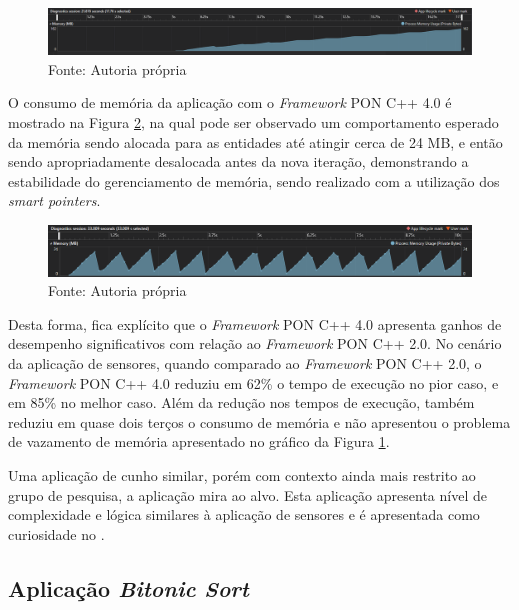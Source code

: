 \begin{figure}[!htb]
\centering
\includegraphics[width=\textwidth]{../figures/fw2_mem.png}
\smallskip
\caption{Consumo de memória \textit{Framework} PON C++ 2.0}
\caption*{Fonte: Autoria própria}
\label{fig:fw2_mem}
\end{figure}

O consumo de memória da aplicação com o \textit{Framework} PON C++ 4.0 é
mostrado na Figura \ref{fig:fw4_mem}, na qual pode ser observado um
comportamento esperado da memória sendo alocada para as entidades até atingir
cerca de 24 MB, e então sendo apropriadamente desalocada antes da nova iteração,
demonstrando a estabilidade do gerenciamento de memória, sendo realizado com a
utilização dos \textit{smart pointers}.

\begin{figure}[!htb]
\centering
\includegraphics[width=\textwidth]{../figures/fw4_mem.png}
\smallskip
\caption{Consumo de memória \textit{Framework} PON C++ 4.0}
\caption*{Fonte: Autoria própria}
\label{fig:fw4_mem}
\end{figure}

Desta forma, fica explícito que o \textit{Framework} PON C++ 4.0 apresenta
ganhos de desempenho significativos com relação ao \textit{Framework} PON C++
2.0. No cenário da aplicação de sensores, quando comparado ao \textit{Framework}
PON C++ 2.0, o \textit{Framework} PON C++ 4.0 reduziu em 62\% o tempo de
execução no pior caso, e em 85\% no melhor caso. Além da redução nos tempos de
execução, também reduziu em quase dois terços o consumo de memória e não
apresentou o problema de vazamento de memória apresentado no gráfico da Figura
\ref{fig:fw2_mem}.

Uma aplicação de cunho similar, porém com contexto ainda mais restrito ao grupo
de pesquisa, a aplicação mira ao alvo. Esta aplicação apresenta nível de
complexidade e lógica similares à aplicação de sensores e é apresentada como
curiosidade no .

\subsection{Aplicação \textit{Bitonic Sort}}\label{sec:bitonic_sort}

